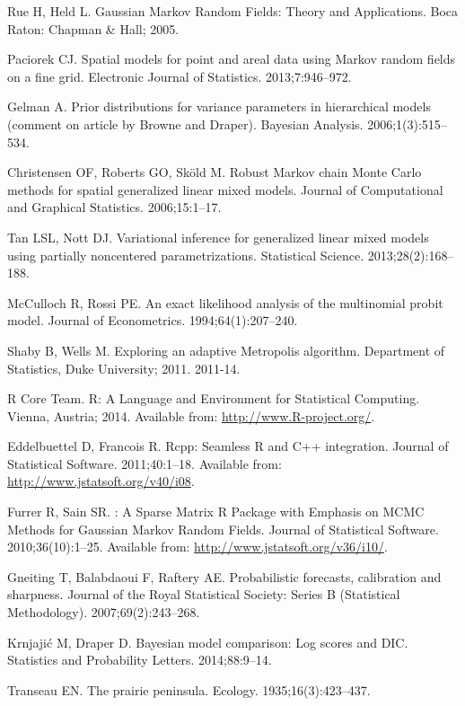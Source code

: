 \documentclass[10pt,letterpaper]{article}
\begin{document}
\begin{thebibliography}{10}
Rue H, Held L.
\newblock Gaussian {M}arkov Random Fields: Theory and Applications.
\newblock Boca Raton: Chapman \& Hall; 2005.

Paciorek CJ.
\newblock Spatial models for point and areal data using {M}arkov random fields
  on a fine grid.
\newblock Electronic Journal of Statistics. 2013;7:946--972.

Gelman A.
\newblock Prior distributions for variance parameters in hierarchical models
  (comment on article by {B}rowne and {D}raper).
\newblock Bayesian Analysis. 2006;1(3):515--534.

Christensen OF, Roberts GO, Sk{\"o}ld M.
\newblock Robust {M}arkov chain {M}onte {C}arlo methods for spatial generalized
  linear mixed models.
\newblock Journal of Computational and Graphical Statistics. 2006;15:1--17.

Tan LSL, Nott DJ.
\newblock Variational inference for generalized linear mixed models using
  partially noncentered parametrizations.
\newblock Statistical Science. 2013;28(2):168--188.

McCulloch R, Rossi PE.
\newblock An exact likelihood analysis of the multinomial probit model.
\newblock Journal of Econometrics. 1994;64(1):207--240.

Shaby B, Wells M.
\newblock Exploring an adaptive {M}etropolis algorithm.
\newblock Department of Statistics, Duke University; 2011. 2011-14.

{R Core Team}. R: A Language and Environment for Statistical Computing.
\newblock Vienna, Austria; 2014.
\newblock Available from: \url{http://www.R-project.org/}.

Eddelbuettel D, Francois R.
\newblock Rcpp: {S}eamless {R} and {C}++ integration.
\newblock Journal of Statistical Software. 2011;40:1--18.
\newblock Available from: \url{http://www.jstatsoft.org/v40/i08}.

Furrer R, Sain SR.
: A Sparse Matrix {R} Package with Emphasis on {MCMC} Methods
  for {G}aussian {M}arkov Random Fields.
\newblock Journal of Statistical Software. 2010;36(10):1--25.
\newblock Available from: \url{http://www.jstatsoft.org/v36/i10/}.

Gneiting T, Balabdaoui F, Raftery AE.
\newblock Probabilistic forecasts, calibration and sharpness.
\newblock Journal of the Royal Statistical Society: Series B (Statistical
  Methodology). 2007;69(2):243--268.

Krnjaji\'{c} M, Draper D.
\newblock Bayesian model comparison: {L}og scores and {DIC}.
\newblock Statistics and Probability Letters. 2014;88:9--14.

Transeau EN.
\newblock The prairie peninsula.
\newblock Ecology. 1935;16(3):423--437.

\end{thebibliography}
\end{document}
